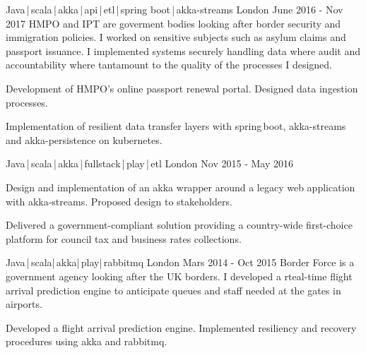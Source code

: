 \begin{cventries}
    \cventry
    {Java\,|\,scala\,|\,akka\,|\,api\,|\,etl\,|\,spring boot\,|\,akka-streams}
    {} 
    {London}
    {June 2016 - Nov 2017}
    {HMPO and IPT are goverment bodies looking after border security and immigration policies. I worked on sensitive subjects such as asylum claims and passport issuance. I implemented systems securely handling data where audit and accountability where tantamount to the quality of the processes I designed.}
    {
        \begin{cvitems}
            \item{Development of HMPO's online passport renewal portal. Designed data ingestion processes.}
            \item{Implementation of resilient data transfer layers with spring\,boot, akka-streams and akka-persistence on kubernetes.}
        \end{cvitems}
    }

    \cventry
    {Java\,|\,scala\,|\,akka\,|\,fullstack\,|\,play\,|\,etl}
    {} 
    {London}
    {Nov 2015 - May 2016}
    {}
    {
        \begin{cvitems}
            \item{Design and implementation of an akka wrapper around a legacy web application with akka-streams. Proposed design to stakeholders.}
            \item{Delivered a government-compliant solution providing a country-wide first-choice platform for council tax and business rates collections.}
        \end{cvitems}
    }

    \cventry
    {Java\,|\,scala|\,akka|\,play|\,rabbitmq}
    {} 
    {London}
    {Mars 2014 - Oct 2015}
    {Border Force is a government agency looking after the UK borders. I developed a rteal-time flight arrival prediction engine to anticipate queues and staff needed at the gates in airports.}
    {
        \begin{cvitems}
            \item{Developed a flight arrival prediction engine. Implemented resiliency and recovery procedures using akka and rabbitmq.}
        \end{cvitems}
    }


\end{cventries}

